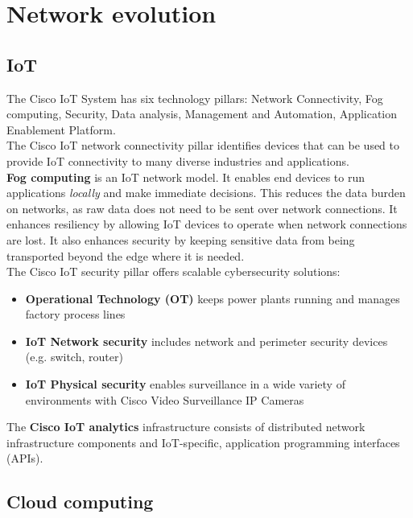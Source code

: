 \chapter{Network evolution}

\section{IoT}

The Cisco IoT System has six technology pillars: Network Connectivity, Fog computing, Security, Data analysis, Management and Automation, Application Enablement Platform.\\

The Cisco IoT network connectivity pillar identifies devices that can be used to provide IoT connectivity to many diverse industries and applications.\\

\textbf{Fog computing} is an IoT network model. It enables end devices to run applications \emph{locally} and make immediate decisions. This reduces the data burden on networks, as raw data does not need to be sent over network connections. It enhances resiliency by allowing IoT devices to operate when network connections are lost. It also enhances security by keeping sensitive data from being transported beyond the edge where it is needed.\\

The Cisco IoT security pillar offers scalable cybersecurity solutions:

\begin{itemize}
\item \textbf{Operational Technology (OT)} keeps power plants running and manages factory process lines
\item \textbf{IoT Network security} includes network and perimeter security devices (e.g. switch, router)
\item \textbf{IoT Physical security} enables surveillance in a wide variety of environments with Cisco Video Surveillance IP Cameras
\end{itemize}

The \textbf{Cisco IoT analytics} infrastructure consists of distributed network infrastructure components and IoT-specific, application programming interfaces (APIs).

\section{Cloud computing}

